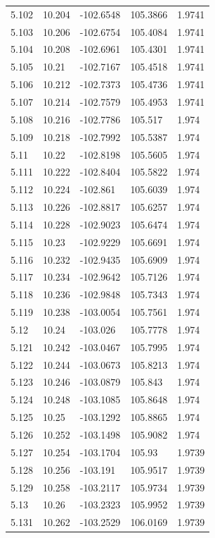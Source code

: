 \begin{tabular}{lllll}
5.102 & 10.204 & -102.6548 & 105.3866 & 1.9741 \\
5.103 & 10.206 & -102.6754 & 105.4084 & 1.9741 \\
5.104 & 10.208 & -102.6961 & 105.4301 & 1.9741 \\
5.105 & 10.21 & -102.7167 & 105.4518 & 1.9741 \\
5.106 & 10.212 & -102.7373 & 105.4736 & 1.9741 \\
5.107 & 10.214 & -102.7579 & 105.4953 & 1.9741 \\
5.108 & 10.216 & -102.7786 & 105.517 & 1.974 \\
5.109 & 10.218 & -102.7992 & 105.5387 & 1.974 \\
5.11 & 10.22 & -102.8198 & 105.5605 & 1.974 \\
5.111 & 10.222 & -102.8404 & 105.5822 & 1.974 \\
5.112 & 10.224 & -102.861 & 105.6039 & 1.974 \\
5.113 & 10.226 & -102.8817 & 105.6257 & 1.974 \\
5.114 & 10.228 & -102.9023 & 105.6474 & 1.974 \\
5.115 & 10.23 & -102.9229 & 105.6691 & 1.974 \\
5.116 & 10.232 & -102.9435 & 105.6909 & 1.974 \\
5.117 & 10.234 & -102.9642 & 105.7126 & 1.974 \\
5.118 & 10.236 & -102.9848 & 105.7343 & 1.974 \\
5.119 & 10.238 & -103.0054 & 105.7561 & 1.974 \\
5.12 & 10.24 & -103.026 & 105.7778 & 1.974 \\
5.121 & 10.242 & -103.0467 & 105.7995 & 1.974 \\
5.122 & 10.244 & -103.0673 & 105.8213 & 1.974 \\
5.123 & 10.246 & -103.0879 & 105.843 & 1.974 \\
5.124 & 10.248 & -103.1085 & 105.8648 & 1.974 \\
5.125 & 10.25 & -103.1292 & 105.8865 & 1.974 \\
5.126 & 10.252 & -103.1498 & 105.9082 & 1.974 \\
5.127 & 10.254 & -103.1704 & 105.93 & 1.9739 \\
5.128 & 10.256 & -103.191 & 105.9517 & 1.9739 \\
5.129 & 10.258 & -103.2117 & 105.9734 & 1.9739 \\
5.13 & 10.26 & -103.2323 & 105.9952 & 1.9739 \\
5.131 & 10.262 & -103.2529 & 106.0169 & 1.9739 \\

\end{tabular}
